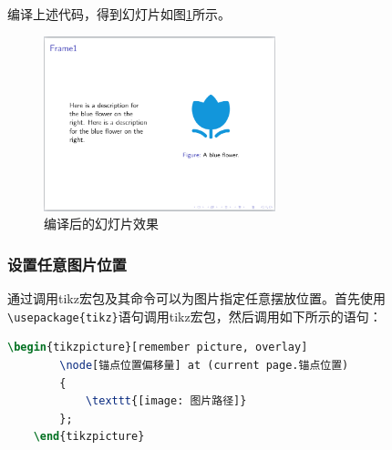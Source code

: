 编译上述代码，得到幻灯片如图\ref{fig:945}所示。

\begin{figure}[htbp]
    \centering
    \includegraphics[width = 0.6\textwidth]{images/ch_9/eg6_5.png}
    \caption{编译后的幻灯片效果}
    \label{fig:945}
\end{figure}

\subsubsection{设置任意图片位置}

通过调用tikz宏包及其命令可以为图片指定任意摆放位置。首先使用\texttt{\textbackslash{}usepackage\{tikz\}}语句调用tikz宏包，然后调用如下所示的语句：

\begin{lstlisting}[language=TeX]
    \begin{tikzpicture}[remember picture, overlay]
        \node[锚点位置偏移量] at (current page.锚点位置) 
        {
            \texttt{[image: 图片路径]}
        };
    \end{tikzpicture}
\end{lstlisting}

